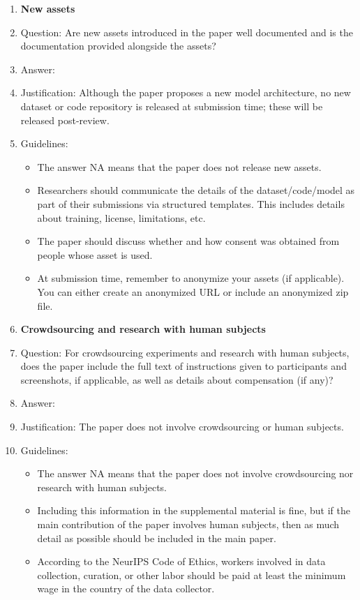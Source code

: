\documentclass{article}
\theoremstyle{plain}
\theoremstyle{definition}
\theoremstyle{remark}
\begin{document}
{\begin{enumerate}
\item {\bf New assets}
    \item[] Question: Are new assets introduced in the paper well documented and is the documentation provided alongside the assets?
    \item[] Answer: \answerNA{}
    \item[] Justification: Although the paper proposes a new model architecture, no new dataset or code repository is released at submission time; these will be released post-review.
    \item[] Guidelines:
    \begin{itemize}
        \item The answer NA means that the paper does not release new assets.
        \item Researchers should communicate the details of the dataset/code/model as part of their submissions via structured templates. This includes details about training, license, limitations, etc. 
        \item The paper should discuss whether and how consent was obtained from people whose asset is used.
        \item At submission time, remember to anonymize your assets (if applicable). You can either create an anonymized URL or include an anonymized zip file.
    \end{itemize}

\item {\bf Crowdsourcing and research with human subjects}
    \item[] Question: For crowdsourcing experiments and research with human subjects, does the paper include the full text of instructions given to participants and screenshots, if applicable, as well as details about compensation (if any)? 
    \item[] Answer: \answerNA{}
    \item[] Justification: The paper does not involve crowdsourcing or human subjects.
    \item[] Guidelines:
    \begin{itemize}
        \item The answer NA means that the paper does not involve crowdsourcing nor research with human subjects.
        \item Including this information in the supplemental material is fine, but if the main contribution of the paper involves human subjects, then as much detail as possible should be included in the main paper. 
        \item According to the NeurIPS Code of Ethics, workers involved in data collection, curation, or other labor should be paid at least the minimum wage in the country of the data collector. 
    \end{itemize}


\end{enumerate}}
\end{document}
